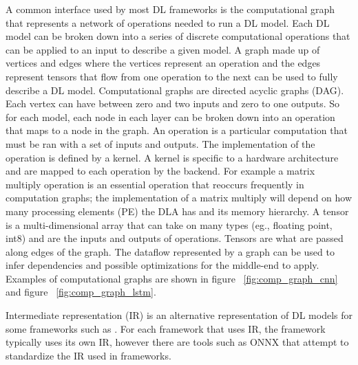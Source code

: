 A common interface used by most DL frameworks is the computational graph
\cite{tensorflow} \cite{cntk} that represents a network of operations needed to
run a DL model. Each DL model can be broken down into a series of discrete
computational operations that can be applied to an input to describe a given
model. A graph made up of vertices and edges where the vertices represent an
operation and the edges represent tensors that flow from one operation to the
next can be used to fully describe a DL model. Computational graphs are
directed acyclic graphs (DAG).  Each vertex can have between zero and two
inputs and zero to one outputs. So for each model, each node in each layer can
be broken down into an operation that maps to a node in the graph. An operation
is a particular computation that must be ran with a set of inputs and outputs.
The implementation of the operation is defined by a kernel. A kernel is
specific to a hardware architecture and are mapped to each operation by the
backend. For example a matrix multiply operation is an essential operation
that reoccurs frequently in computation graphs; the implementation of a matrix
multiply will depend on how many processing elements (PE) the DLA has and its
memory hierarchy. A tensor is a multi-dimensional array that can take on many
types (eg., floating point, int8) and are the inputs and outputs of operations.
Tensors are what are passed along edges of the graph. The dataflow represented
by a graph can be used to infer dependencies and possible optimizations for the
middle-end to apply. Examples of computational graphs are shown in figure
~\ref{fig:comp_graph_cnn} and figure ~\ref{fig:comp_graph_lstm}.

Intermediate representation (IR) is an alternative representation of DL models
for some frameworks such as \cite{DLVM} \cite{nGraph} \cite{ONNX}. For each
framework that uses IR, the framework typically uses its own IR, however
there are tools such as ONNX that attempt to standardize the IR used in
frameworks. 

